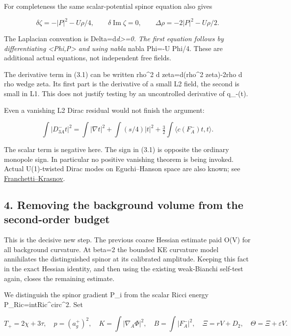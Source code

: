 \documentclass[
  10pt,
]{article}
\begin{document}
For completeness the same scalar-potential spinor equation also gives

\[
 \delta\zeta=-|P|^2-U\rho/4,\qquad
 \delta\operatorname{Im}\zeta=0,\qquad
 \Delta\rho=-2|P|^2-U\rho/2.                         \tag{3.2}
\]

The Laplacian convention is Delta=d\emph{d\textgreater=0. The first
equation follows by differentiating \textless Phi,P\textgreater{} and
using nabla} nabla Phi=-U Phi/4. These are additional actual equations,
not independent free fields.

The derivative term in (3.1) can be written rho\^{}2 d zeta=d(rho\^{}2
zeta)-2rho d rho wedge zeta. Its first part is the derivative of a small
L2 field, the second is small in L1. This does not justify testing by an
uncontrolled derivative of q\_-(t).

Even a vanishing L2 Dirac residual would not finish the argument:

\[
 \int|D^-_{3A}t|^2=\int|\nabla t|^2+\int(s/4)|t|^2
       +\tfrac32\int\langle c(F_A^-)t,t\rangle.       \tag{3.3}
\]

The scalar term is negative here. The sign in (3.1) is opposite the
ordinary monopole sign. In particular no positive vanishing theorem is
being invoked. Actual U(1)-twisted Dirac modes on Eguchi--Hanson space
are also known; see
\href{https://arxiv.org/abs/2309.08453}{Franchetti--Krasnov}.

\hypertarget{removing-the-background-volume-from-the-second-order-budget}{%
\subsection{4. Removing the background volume from the second-order
budget}\label{removing-the-background-volume-from-the-second-order-budget}}

This is the decisive new step. The previous coarse Hessian estimate paid
O(V) for all background curvature. At beta=2 the bounded KE curvature
model annihilates the distinguished spinor at its calibrated amplitude.
Keeping this fact in the exact Hessian identity, and then using the
existing weak-Bianchi self-test again, closes the remaining estimate.

We distinguish the spinor gradient P\_i from the scalar Ricci energy
P\_Ric=int\textbar Ric\^{}circ\textbar\^{}2. Set

\[
 T_+=2\chi+3\tau,\quad p=(a_g^+)^2,\quad
 K=\int|\nabla_A\Phi|^2,\quad B=\int|F_A^-|^2,
 \quad \Xi=rV+D_2,\quad\Theta=\Xi+\varepsilon V.
\]
\end{document}
